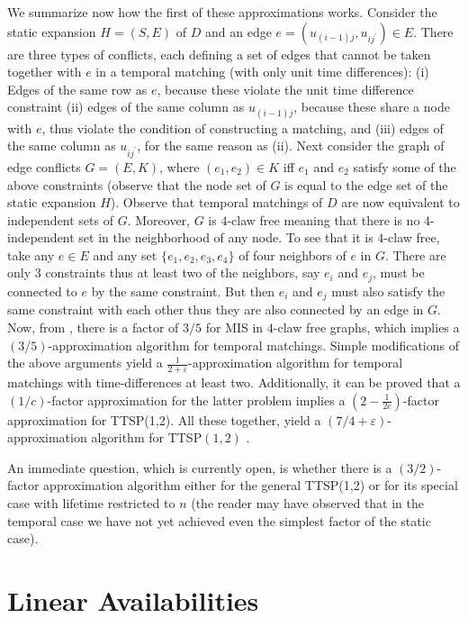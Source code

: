 \documentclass[oribibl, 11pt]{llncs}
\begin{document}
We summarize now how the first of these approximations works. Consider the static expansion $H=(S,E)$ of $D$ and an edge $e=(u_{(i-1)j},u_{ij^\prime})\in E$. There are three types of conflicts, each defining a set of edges that cannot be taken together with $e$ in a temporal matching (with only unit time differences): (i) Edges of the same row as $e$, because these violate the unit time difference constraint (ii) edges of the same column as $u_{(i-1)j}$, because these share a node with $e$, thus violate the condition of constructing a matching, and (iii) edges of the same column as $u_{ij^\prime}$, for the same reason as (ii). Next consider the graph of edge conflicts $G=(E,K)$, where $(e_1,e_2)\in K$ iff $e_1$ and $e_2$ satisfy some of the above constraints (observe that the node set of $G$ is equal to the edge set of the static expansion $H$). Observe that temporal matchings of $D$ are now equivalent to independent sets of $G$. Moreover, $G$ is $4$-claw free meaning that there is no 4-independent set in the neighborhood of any node. To see that it is $4$-claw free, take any $e\in E$ and any set $\{e_1,e_2,e_3,e_4\}$ of four neighbors of $e$ in $G$. There are only 3 constraints thus at least two of the neighbors, say $e_i$ and $e_j$, must be connected to $e$ by the same constraint. But then $e_i$ and $e_j$ must also satisfy the same constraint with each other thus they are also connected by an edge in $G$. Now, from \cite{Ha95}, there is a factor of $3/5$ for {\sc MIS} in $4$-claw free graphs, which implies a $(3/5)$-approximation algorithm for temporal matchings. Simple modifications of the above arguments yield a $\frac{1}{2+\varepsilon}$-approximation algorithm for temporal matchings with time-differences at least two. Additionally, it can be proved that a $(1/c)$-factor approximation for the latter problem implies a $(2-\frac{1}{2c})$-factor approximation for TTSP(1,2). All these together, yield a $(7/4+\varepsilon)$-approximation algorithm for TTSP$(1,2)$ \cite{MS14}. 

An immediate question, which is currently open, is whether there is a $(3/2)$-factor approximation algorithm either for the general TTSP(1,2) or for its special case with lifetime restricted to $n$ (the reader may have observed that in the temporal case we have not yet achieved even the simplest factor of the static case).

\section{Linear Availabilities}
\label{sec:linear}
\end{document}
